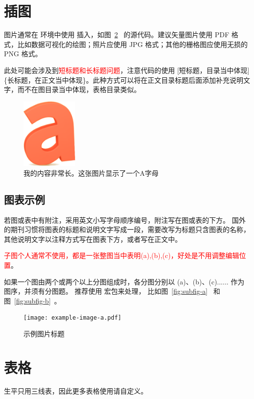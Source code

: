 \section{插图}

图片通常在  环境中使用  插入，如图~\ref{fig:example}~ 的源代码。建议矢量图片使用 PDF 格式，比如数据可视化的绘图；照片应使用 JPG 格式；其他的栅格图应使用无损的 PNG 格式。

此处可能会涉及到\textcolor{red}{短标题和长标题问题}，注意代码的使用 [短标题，目录当中体现]\{长标题，在正文当中体现\}。此种方式可以将在正文目录标题后面添加补充说明文字，而不在图目录当中体现，表格目录类似。
\begin{figure}[htb]
  \centering
  \includegraphics[width=0.25\textwidth]{figures/demo.png}
  \caption[内容精简出现在表目录]{我的内容非常长。这张图片显示了一个A字母}
  \label{fig:demo}
\end{figure}

\subsection{图表示例}
若图或表中有附注，采用英文小写字母顺序编号，附注写在图或表的下方。
国外的期刊习惯将图表的标题和说明文字写成一段，需要改写为标题只含图表的名称，其他说明文字以注释方式写在图表下方，或者写在正文中。

\textcolor{red}{子图个人通常不使用，都是一张整图当中表明(a),(b),(c)，好处是不用调整编辑位置}。
\par 如果一个图由两个或两个以上分图组成时，各分图分别以 (a)、(b)、(c)...... 作为图序，并须有分图题。
推荐使用  宏包来处理， 比如图~\ref{fig:subfig-a}~ 和图~\ref{fig:subfig-b}~。
\begin{figure}[htb]
  \centering
  \texttt{[image: example-image-a.pdf]}
  \caption{示例图片标题}
  \label{fig:example}
\end{figure}


\section{表格}
生平只用三线表，因此更多表格使用请自定义。

